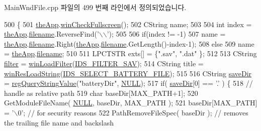 Main\+Wnd\+File.\+cpp 파일의 499 번째 라인에서 정의되었습니다.


\begin{DoxyCode}
500 \{
501   \mbox{\hyperlink{_v_b_a_8cpp_a8095a9d06b37a7efe3723f3218ad8fb3}{theApp}}.\mbox{\hyperlink{class_v_b_a_a340eaeeb7fcfc242f08ac3442d991a96}{winCheckFullscreen}}();
502   CString name;
503 
504   \textcolor{keywordtype}{int} index = \mbox{\hyperlink{_v_b_a_8cpp_a8095a9d06b37a7efe3723f3218ad8fb3}{theApp}}.\mbox{\hyperlink{class_v_b_a_a66eee6b61ec8bee20f21164cb0c37d2d}{filename}}.ReverseFind(\textcolor{charliteral}{'\(\backslash\)\(\backslash\)'});
505 
506   \textcolor{keywordflow}{if}(index != -1)
507     name = \mbox{\hyperlink{_v_b_a_8cpp_a8095a9d06b37a7efe3723f3218ad8fb3}{theApp}}.\mbox{\hyperlink{class_v_b_a_a66eee6b61ec8bee20f21164cb0c37d2d}{filename}}.Right(\mbox{\hyperlink{_v_b_a_8cpp_a8095a9d06b37a7efe3723f3218ad8fb3}{theApp}}.\mbox{\hyperlink{class_v_b_a_a66eee6b61ec8bee20f21164cb0c37d2d}{filename}}.GetLength()-index-1);
508   \textcolor{keywordflow}{else}
509     name = \mbox{\hyperlink{_v_b_a_8cpp_a8095a9d06b37a7efe3723f3218ad8fb3}{theApp}}.\mbox{\hyperlink{class_v_b_a_a66eee6b61ec8bee20f21164cb0c37d2d}{filename}};
510 
511   LPCTSTR exts[] = \{\textcolor{stringliteral}{".sav"}, \textcolor{stringliteral}{".dat"} \};
512 
513   CString \mbox{\hyperlink{_s_d_l_8cpp_af0122ee4312107103b580a98c74a4ea6}{filter}} = \mbox{\hyperlink{class_main_wnd_a7adc4aa2a10246fa13637e9d0870843d}{winLoadFilter}}(\mbox{\hyperlink{resource_8h_a3b83a1ed12d4b20b4f8a6d29cb9c9e1d}{IDS\_FILTER\_SAV}});
514   CString title = \mbox{\hyperlink{_win_res_util_8cpp_a416e85e80ab9b01376e87251c83d1a5a}{winResLoadString}}(\mbox{\hyperlink{resource_8h_a5f54e7c606b3396e67d25b17c88f6f97}{IDS\_SELECT\_BATTERY\_FILE}});
515 
516   CString \mbox{\hyperlink{_s_d_l_8cpp_a7b37d94db9ce90c610565cb80ff50444}{saveDir}} = \mbox{\hyperlink{_reg_8cpp_a618826d274df0d9c19fab2ff28bd9008}{regQueryStringValue}}(\textcolor{stringliteral}{"batteryDir"}, 
      \mbox{\hyperlink{getopt1_8c_a070d2ce7b6bb7e5c05602aa8c308d0c4}{NULL}});
517   \textcolor{keywordflow}{if}( \mbox{\hyperlink{_s_d_l_8cpp_a7b37d94db9ce90c610565cb80ff50444}{saveDir}}[0] == \textcolor{charliteral}{'.'} ) \{
518       \textcolor{comment}{// handle as relative path}
519       \textcolor{keywordtype}{char} baseDir[MAX\_PATH+1];
520       GetModuleFileName( \mbox{\hyperlink{getopt1_8c_a070d2ce7b6bb7e5c05602aa8c308d0c4}{NULL}}, baseDir, MAX\_PATH );
521       baseDir[MAX\_PATH] = \textcolor{charliteral}{'\(\backslash\)0'}; \textcolor{comment}{// for security reasons}
522       PathRemoveFileSpec( baseDir ); \textcolor{comment}{// removes the trailing file name and backslash}

\end{DoxyCode}

